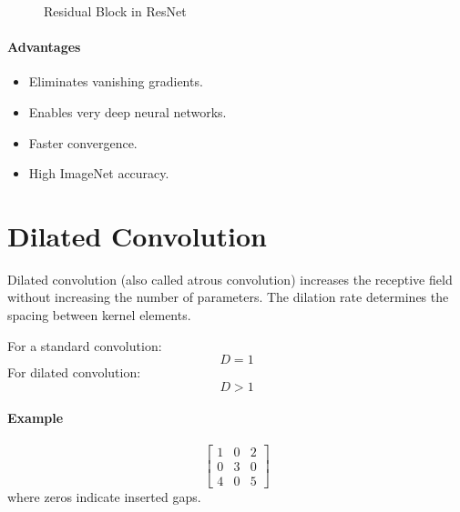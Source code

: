 \documentclass[11pt]{article}
\begin{document}
\begin{figure}[H]
\centering
{}
\caption{Residual Block in ResNet}
\label{fig:residual_block}
\end{figure}

\paragraph{Advantages}
\begin{itemize}[leftmargin=*]
    \item Eliminates vanishing gradients.
    \item Enables very deep neural networks.
    \item Faster convergence.
    \item High ImageNet accuracy.
\end{itemize}

\section{Dilated Convolution}
Dilated convolution (also called atrous convolution) increases the receptive field without increasing the number of parameters. The dilation rate determines the spacing between kernel elements.

For a standard convolution:
\[
D = 1
\]
For dilated convolution:
\[
D > 1
\]

\paragraph{Example}
\[
\begin{bmatrix}
1 & 0 & 2 \\
0 & 3 & 0 \\
4 & 0 & 5
\end{bmatrix}
\]
where zeros indicate inserted gaps.
\end{document}
